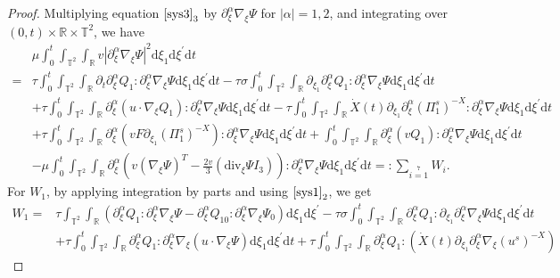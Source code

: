 \documentclass[10pt,a4paper]{amsart}
\newcommand{\ddiv}{\mathrm{div}}
\newcommand{\dif}{\mathrm{d}}
\begin{document}
\begin{proof}
 Multiplying equation $\eqref{sys3}_3$ by $\partial_\xi^\alpha\nabla_\xi\Psi$ for $|\alpha|=1,2$, and integrating over $(0, t)\times\mathbb{R}\times\mathbb{T}^2$, we have
\begin{align*}
&\mu\int_0^t\int_{\mathbb{T}^2}\int_{\mathbb{R}}v|\partial_\xi^\alpha\nabla_\xi\Psi|^2\dif \xi_1\dif \xi^{\prime}\dif t
\\
=&\tau\int_0^t\int_{\mathbb{T}^2}\int_{\mathbb{R}}
\partial_t\partial_\xi^\alpha Q_1
:\partial_\xi^\alpha\nabla_\xi\Psi\dif \xi_1\dif \xi^{\prime}\dif t
-\tau\sigma\int_0^t\int_{\mathbb{T}^2}\int_{\mathbb{R}}
\partial_{\xi_1}\partial_\xi^\alpha Q_1
:\partial_\xi^\alpha\nabla_\xi\Psi\dif \xi_1\dif \xi^{\prime}\dif t\\
&+\tau\int_0^t\int_{\mathbb{T}^2}\int_{\mathbb{R}}
        \partial_\xi^\alpha ( u\cdot\nabla_\xi Q_1)
:\partial_\xi^\alpha\nabla_\xi\Psi\dif \xi_1\dif \xi^{\prime}\dif t
-\tau\int_0^t\int_{\mathbb{T}^2}\int_{\mathbb{R}}
     \dot{X}(t)\partial_{\xi_1}\partial_\xi^\alpha(\Pi_1^s)^{-X}
:\partial_\xi^\alpha\nabla_\xi\Psi\dif \xi_1\dif \xi^{\prime}\dif t\\
&+\tau\int_0^t\int_{\mathbb{T}^2}\int_{\mathbb{R}}
        \partial_\xi^\alpha(vF\partial_{\xi_1}(\Pi_1^s)^{-X})
:\partial_\xi^\alpha\nabla_\xi\Psi\dif \xi_1\dif \xi^{\prime}\dif t
+\int_0^t\int_{\mathbb{T}^2}\int_{\mathbb{R}}
    \partial_\xi^\alpha(v  Q_1)
:\partial_\xi^\alpha\nabla_\xi\Psi\dif \xi_1\dif \xi^{\prime}\dif t\\
&-\mu\int_0^t\int_{\mathbb{T}^2}\int_{\mathbb{R}}
\partial_\xi^\alpha\left(v\left(\nabla_\xi\Psi\right)^T
-\frac{2v}{3}\left(\ddiv_\xi\Psi I_3\right)\right):\partial_\xi^\alpha\nabla_\xi\Psi
\dif \xi_1\dif \xi^{\prime}\dif t=:\sum\limits_{i=1}\limits^7W_i.
\end{align*}
For $W_1$, by applying integration by parts and using $\eqref{sys1}_2$, we get
\begin{align*}
W_1
=&\tau\int_{\mathbb{T}^2}\int_{\mathbb{R}}
\left(\partial_\xi^\alpha Q_1
:\partial_\xi^\alpha\nabla_\xi\Psi
-\partial_\xi^\alpha Q_{10}
:\partial_\xi^\alpha\nabla_\xi\Psi_0\right)\dif \xi_1\dif \xi^{\prime}
-\tau\sigma\int_0^t\int_{\mathbb{T}^2}\int_{\mathbb{R}}
\partial_\xi^\alpha Q_1: \partial_{\xi_1}\partial_\xi^\alpha\nabla_\xi\Psi
\dif \xi_1\dif \xi^{\prime}\dif t\\
&+\tau\int_0^t\int_{\mathbb{T}^2}\int_{\mathbb{R}}
\partial_\xi^\alpha Q_1: \partial_\xi^\alpha\nabla_\xi(u\cdot\nabla_\xi\Psi)
        \dif \xi_1\dif \xi^{\prime}\dif t
+\tau\int_0^t\int_{\mathbb{T}^2}\int_{\mathbb{R}}
\partial_\xi^\alpha Q_1: (\dot{X}(t)\partial_{\xi_1}\partial_\xi^\alpha\nabla_\xi(u^s)^{-X})

\end{align*}
\end{proof}
\end{document}
